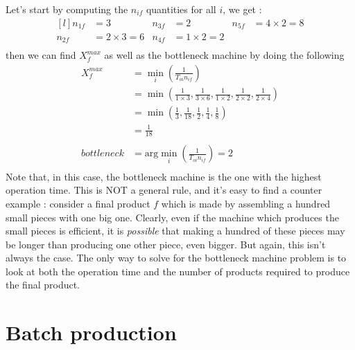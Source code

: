 Let's start by computing the $n_{if}$ quantities for all $i$, we get :
\[
    \begin{aligned}[l]
        n_{1f} &= 3 & n_{3f} &= 2 & n_{5f} &= 4\times 2 = 8\\
        n_{2f} &= 2\times 3 = 6 & n_{4f} &= 1\times 2 = 2\\
    \end{aligned}
\]
then we can find $X_f^{max}$ as well as the bottleneck machine by doing the following
\[
    \begin{split}
        X_f^{max} &= \min_i\left( \frac{1}{T_{oi}n_{if}} \right)\\
                  &= \min\left( \frac{1}{1\times 3} , \frac{1}{3\times 6} , \frac{1}{1\times 2} , \frac{1}{2\times 2} , \frac{1}{2\times 4} \right)\\
                  &= \min\left( \frac{1}{3} , \frac{1}{18} , \frac{1}{2} , \frac{1}{4} , \frac{1}{8} \right)\\
                  &= \frac{1}{18}\\
                  \\
        bottleneck &= \textrm{arg}\min_i\left( \frac{1}{T_{oi}n_{if}} \right) = 2\\
    \end{split}
\]
Note that, in this case, the bottleneck machine is the one with the highest operation time. This is NOT a general rule, and it's easy to find a counter example : consider a final product $f$ which is made by assembling a hundred small pieces with one big one. Clearly, even if the machine which produces the small pieces is efficient, it is \emph{possible} that making a hundred of these pieces may be longer than producing one other piece, even bigger. But again, this isn't always the case. The only way to solve for the bottleneck machine problem is to look at both the operation time and the number of products required to produce the final product. 

\section{Batch production}

